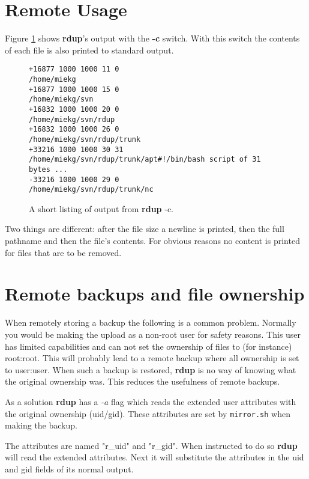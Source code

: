 \documentclass[a4paper, openany]{memoir}
\newcommand{\rdup}{\textbf{rdup}}
\newcommand{\cmd}[1]{\texttt{#1}}
\newcommand{\flag}[1]{\textit{#1}}
\begin{document}
\section{Remote Usage}
Figure \ref{fig:rdup -c output} shows \rdup's output with the
\textbf{-c} switch. With this switch the contents of each file is also
printed to standard output.

\begin{figure}[hbt]
\begin{verbatim}
+16877 1000 1000 11 0 
/home/miekg
+16877 1000 1000 15 0 
/home/miekg/svn
+16832 1000 1000 20 0 
/home/miekg/svn/rdup
+16832 1000 1000 26 0 
/home/miekg/svn/rdup/trunk
+33216 1000 1000 30 31 
/home/miekg/svn/rdup/trunk/apt#!/bin/bash script of 31 bytes ...
-33216 1000 1000 29 0 
/home/miekg/svn/rdup/trunk/nc
\end{verbatim}
\caption{A short listing of output from \rdup{} -c.}
\label{fig:rdup -c output}
\end{figure}

Two things are different: after the file size a newline is printed, then
the full pathname and then the file's contents.  For obvious reasons no
content is printed for files that are to be removed.

\section{Remote backups and file ownership}
When remotely storing a backup the following is a common problem.
Normally you would be making the upload as a non-root user for safety
reasons. This user has limited capabilities and can not set the ownership
of files to (for instance) root:root. This will probably lead to a
remote backup where all ownership is set to user:user. When such a
backup is restored, \rdup{} is no way of knowing what the original
ownership was. This reduces the usefulness of remote backups.

As a solution \rdup{} has a \flag{-a} flag which reads the
extended user attributes with the original ownership (uid/gid).
These attributes are set by \cmd{mirror.sh} when making the backup.

The attributes are named "r\_uid" and "r\_gid". When instructed to
do so \rdup{} will read the extended attributes. Next it will 
substitute the attributes in the uid and gid fields of its
normal output.
\end{document}
